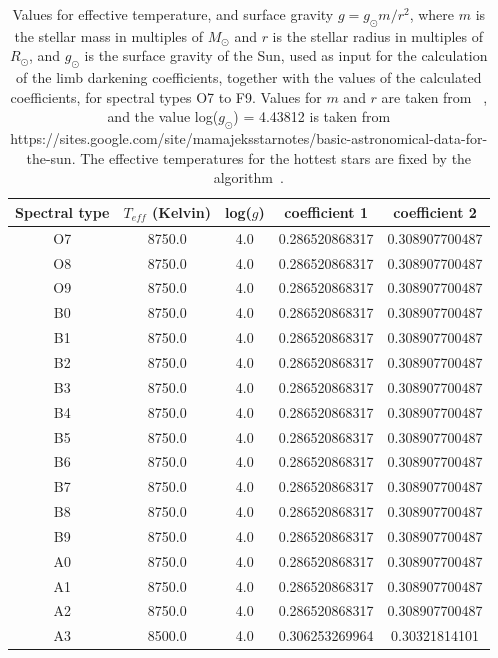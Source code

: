 \documentclass[11pt]{article}      %
\begin{document}
\begin{table}[hbtp]
  \begin{center}
  \caption{Values for effective temperature, and surface gravity $g=g_{\odot}m/r^2$, where $m$ is the stellar mass in multiples of $M_{\odot}$ and $r$ is the stellar radius in multiples of $R_{\odot}$, and $g_{\odot}$ is the surface gravity of the Sun, used as input for the calculation of the limb darkening coefficients, together with the values of the calculated coefficients, for spectral types O7 to F9. Values for $m$ and $r$ are taken from ~\cite{stellarParameters}, and the value log($g_{\odot}$) = 4.43812 is taken from https://sites.google.com/site/mamajeksstarnotes/basic-astronomical-data-for-the-sun. The effective temperatures for the hottest stars are fixed by the algorithm~\cite{limbDarkening_code}.}
  \begin{tabular}{| c | c | c | c | c |}
    \hline 
    Spectral type & $T_{eff}$ (Kelvin) & log($g$) & coefficient 1 & coefficient 2\\
    \hline
O7 & 8750.0 & 4.0 & 0.286520868317 & 0.308907700487 \\
O8 & 8750.0 & 4.0 & 0.286520868317 & 0.308907700487 \\
O9 & 8750.0 & 4.0 & 0.286520868317 & 0.308907700487 \\
B0 & 8750.0 & 4.0 & 0.286520868317 & 0.308907700487 \\
B1 & 8750.0 & 4.0 & 0.286520868317 & 0.308907700487 \\
B2 & 8750.0 & 4.0 & 0.286520868317 & 0.308907700487 \\
B3 & 8750.0 & 4.0 & 0.286520868317 & 0.308907700487 \\
B4 & 8750.0 & 4.0 & 0.286520868317 & 0.308907700487 \\
B5 & 8750.0 & 4.0 & 0.286520868317 & 0.308907700487 \\
B6 & 8750.0 & 4.0 & 0.286520868317 & 0.308907700487 \\
B7 & 8750.0 & 4.0 & 0.286520868317 & 0.308907700487 \\
B8 & 8750.0 & 4.0 & 0.286520868317 & 0.308907700487 \\
B9 & 8750.0 & 4.0 & 0.286520868317 & 0.308907700487 \\
A0 & 8750.0 & 4.0 & 0.286520868317 & 0.308907700487 \\
A1 & 8750.0 & 4.0 & 0.286520868317 & 0.308907700487 \\
A2 & 8750.0 & 4.0 & 0.286520868317 & 0.308907700487 \\
A3 & 8500.0 & 4.0 & 0.306253269964 & 0.30321814101 \\

\end{tabular}
\end{center}
\end{table}
\end{document}
